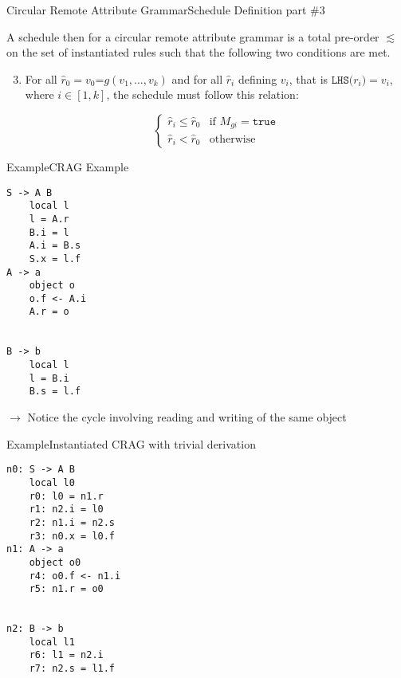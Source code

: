 \begin{frame}{Circular Remote Attribute Grammar}{Schedule Definition part \#3}
\begin{definition}
A schedule then for a circular remote attribute grammar is a total pre-order $\lesssim$ on the set of instantiated rules such that the following two conditions are met.

\begin{enumerate}
\setcounter{enumi}{2}
  \item For all $\hat{r}_0 = v_0 \texttt{=} g(v_1, \dots , v_k)$ and for all $\hat{r}_i$ defining $v_i$, that is $\texttt{LHS($r_i$)} = v_i$, where $i \in [1, k]$, the schedule must follow this relation:
  
  \[ 
  \begin{cases}
  \hat{r}_i \le \hat{r}_0   & \text{if } M_{gi} = \texttt{true} \\
  \hat{r}_i < \hat{r}_0 & \text{otherwise}
  \end{cases}
  \]
\end{enumerate}
\end{definition}
\end{frame}


\begin{frame}[fragile=singleslide]{Example}{CRAG Example}

\begin{multicols}{3}
\begin{Verbatim}[fontsize=\small]
S -> A B
    local l
    l = A.r
    B.i = l
    A.i = B.s
    S.x = l.f
A -> a
    object o
    o.f <- A.i
    A.r = o


B -> b
    local l
    l = B.i
    B.s = l.f
\end{Verbatim}
\end{multicols}

\newlinevspace

$\to$ Notice the \alert{cycle} involving reading and writing of the same object

\end{frame}


\begin{frame}[fragile=singleslide]{Example}{Instantiated CRAG with trivial derivation}

\begin{multicols}{3}
\begin{Verbatim}[fontsize=\small]
n0: S -> A B
    local l0
    r0: l0 = n1.r
    r1: n2.i = l0
    r2: n1.i = n2.s
    r3: n0.x = l0.f
n1: A -> a
    object o0
    r4: o0.f <- n1.i
    r5: n1.r = o0


n2: B -> b
    local l1
    r6: l1 = n2.i
    r7: n2.s = l1.f
\end{Verbatim}
\end{multicols}


\end{frame}

